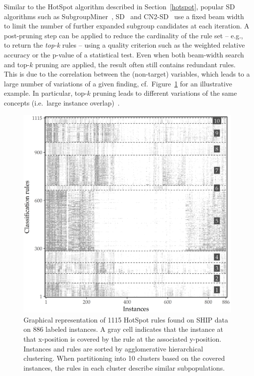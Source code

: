 \documentclass[
  oneside]{book}
\begin{document}
Similar to the HotSpot algorithm described in Section~\ref{hotspot}, popular SD algorithms such as SubgroupMiner~\autocite{Kloesgen:SubgroupMiner2002},
SD~\autocite{Gamberger:SD02} and CN2-SD~\autocite{Lavravc:CN2-SD04} use a fixed beam width to limit the number of further expanded subgroup candidates at each iteration.
A post-pruning step can be applied to reduce the cardinality of the rule set -- e.g., to return the \emph{top-k} rules -- using a quality criterion such as the weighted relative accuracy or the p-value of a statistical test.
Even when both beam-width search and top-\(k\) pruning are applied, the result often still contains redundant rules.
This is due to the correlation between the (non-target) variables, which leads to a large number of variations of a given finding, cf.~Figure~\ref{fig:04-rule-overlap-heatmap} for an illustrative example.
In particular, top-\(k\) pruning leads to different variations of the same concepts (i.e.~large instance overlap)~\autocite{VanLeeuwen:DSSD12}.



\begin{figure}

{\centering \includegraphics[width=0.6\linewidth]{figures/04-rule-overlap-heatmap} 

}

\caption{Graphical representation of 1115 HotSpot rules found on SHIP data on 886 labeled instances. A gray cell indicates that the instance at that x-position is covered by the rule at the associated y-position. Instances and rules are sorted by agglomerative hierarchical clustering. When partitioning into 10 clusters based on the covered instances, the rules in each cluster describe similar subpopulations.}\label{fig:04-rule-overlap-heatmap}
\end{figure}
\end{document}
